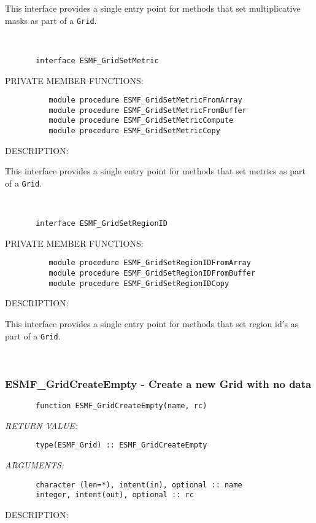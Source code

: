       This interface provides a single entry point for methods that set
       multiplicative masks as part of a {\tt Grid}.
   
 
\mbox{}\hrulefill\ 
 

\begin{verbatim}       interface ESMF_GridSetMetric
 \end{verbatim}{\sf PRIVATE MEMBER FUNCTIONS:}
\begin{verbatim}          module procedure ESMF_GridSetMetricFromArray
          module procedure ESMF_GridSetMetricFromBuffer
          module procedure ESMF_GridSetMetricCompute
          module procedure ESMF_GridSetMetricCopy
 \end{verbatim}
{\sf DESCRIPTION:\\ }


       This interface provides a single entry point for methods that set
       metrics as part of a {\tt Grid}.
   
 
\mbox{}\hrulefill\ 
 

\begin{verbatim}       interface ESMF_GridSetRegionID
 \end{verbatim}{\sf PRIVATE MEMBER FUNCTIONS:}
\begin{verbatim}          module procedure ESMF_GridSetRegionIDFromArray
          module procedure ESMF_GridSetRegionIDFromBuffer
          module procedure ESMF_GridSetRegionIDCopy
 \end{verbatim}
{\sf DESCRIPTION:\\ }


       This interface provides a single entry point for methods that set
       region id's as part of a {\tt Grid}.
   
 
\mbox{}\hrulefill\ 
 
\subsubsection{ESMF\_GridCreateEmpty - Create a new Grid with no data}


 
\begin{verbatim}       function ESMF_GridCreateEmpty(name, rc)\end{verbatim}{\em RETURN VALUE:}
\begin{verbatim}       type(ESMF_Grid) :: ESMF_GridCreateEmpty\end{verbatim}{\em ARGUMENTS:}
\begin{verbatim}       character (len=*), intent(in), optional :: name
       integer, intent(out), optional :: rc\end{verbatim}
{\sf DESCRIPTION:\\ }


